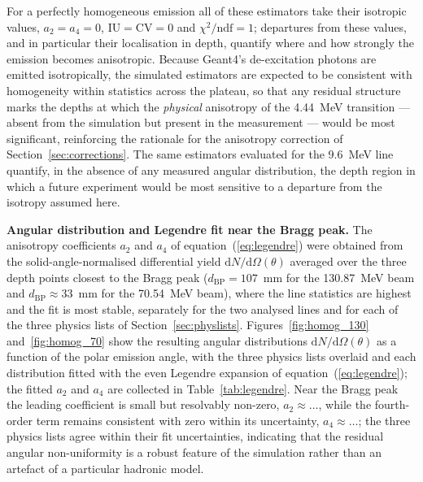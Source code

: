 \documentclass[a4paper]{article}
\begin{document}
For a perfectly homogeneous emission all of these estimators take their isotropic values, $a_2 = a_4 = 0$, $\mathrm{IU} = \mathrm{CV} = 0$ and $\chi^2/\mathrm{ndf} = 1$; departures from these values, and in particular their localisation in depth, quantify where and how strongly the emission becomes anisotropic. Because Geant4's de-excitation photons are emitted isotropically, the simulated estimators are expected to be consistent with homogeneity within statistics across the plateau, so that any residual structure marks the depths at which the \emph{physical} anisotropy of the 4.44~MeV transition — absent from the simulation but present in the measurement — would be most significant, reinforcing the rationale for the anisotropy correction of Section~\ref{sec:corrections}. The same estimators evaluated for the 9.6~MeV line quantify, in the absence of any measured angular distribution, the depth region in which a future experiment would be most sensitive to a departure from the isotropy assumed here.

\textbf{Angular distribution and Legendre fit near the Bragg peak.}
The anisotropy coefficients $a_2$ and $a_4$ of equation~(\ref{eq:legendre}) were obtained from the solid-angle-normalised differential yield $\mathrm{d}N/\mathrm{d}\Omega(\theta)$ averaged over the three depth points closest to the Bragg peak ($d_\mathrm{BP} = 107$~mm for the 130.87~MeV beam and $d_\mathrm{BP} \approx 33$~mm for the 70.54~MeV beam), where the line statistics are highest and the fit is most stable, separately for the two analysed lines and for each of the three physics lists of Section~\ref{sec:physlists}. Figures~\ref{fig:homog_130} and~\ref{fig:homog_70} show the resulting angular distributions $\mathrm{d}N/\mathrm{d}\Omega(\theta)$ as a function of the polar emission angle, with the three physics lists overlaid and each distribution fitted with the even Legendre expansion of equation~(\ref{eq:legendre}); the fitted $a_2$ and $a_4$ are collected in Table~\ref{tab:legendre}.
Near the Bragg peak the leading coefficient is small but resolvably non-zero, $a_2 \approx \ldots$, while the fourth-order term remains consistent with zero within its uncertainty, $a_4 \approx \ldots$; the three physics lists agree within their fit uncertainties, indicating that the residual angular non-uniformity is a robust feature of the simulation rather than an artefact of a particular hadronic model.
\end{document}
